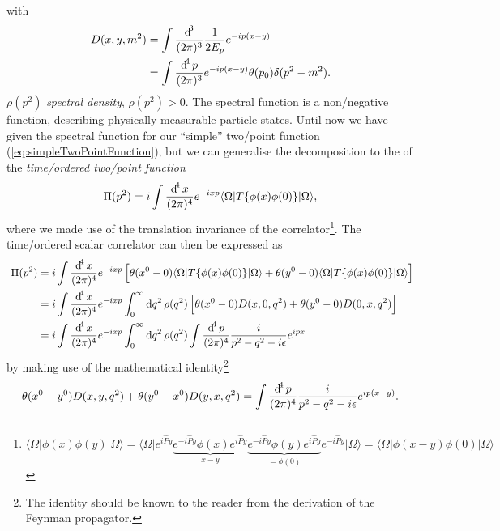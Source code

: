 \documentclass[../../index.tex]{subfiles}
\begin{document}
with
\begin{equation}
  \begin{split}
    D(x,y,m^2) &= \int \frac{\dif^3}{(2\pi)^3} \frac{1}{2E_p} e^{-i p (x-y)} \\
    &= \int \frac{\dif^4 p}{(2\pi)^3} e^{-i p (x-y)} \theta(p_0) \delta(p^2 -
    m^2).
  \end{split}
\end{equation}
$\rho(p^2)$ \textit{spectral density}, $\rho(p^2) > 0$. The spectral function is
a non\-/negative function, describing physically measurable particle states.
Until now we have given the spectral function for our ``simple'' two\-/point
function (\cref{eq:simpleTwoPointFunction}), but we can generalise the
decomposition to the  of the
\textit{time\-/ordered two\-/point function}
\begin{equation}
  \Pi(p^2) = i\int\fdif{x} e^{-ixp}\langle\Omega\vert T\{\phi(x)\phi(0) \} \vert\Omega\rangle,
\end{equation}
where we made use of the translation invariance of the correlator\footnote{
  $\langle\Omega\vert\phi(x)\phi(y)\vert\Omega\rangle = \langle\Omega\vert
  e^{i\hat P y}\underbrace{e^{-i\hat P y}\phi(x)e^{i\hat P
      y}}_{x-y}\underbrace{e^{-i\hat P y}\phi(y)e^{i \hat P y}}_{=\phi(0)}e^{-i
    \hat P y} \vert\Omega\rangle =
  \langle\Omega\vert\phi(x-y)\phi(0)\vert\Omega\rangle$}. The time\-/ordered
scalar correlator can then be expressed as
\begin{equation}
  \
  \begin{split}
    \Pi(p^2)
    &= i\int\fdif{x}e^{-ixp}\left[\theta(x^0-0) \langle\Omega\vert T\{ \phi(x)\phi(0) \} \vert\Omega\rangle + \theta(y^0-0)\langle\Omega\vert T\{ \phi(x)\phi(0) \} \vert\Omega\rangle\right]  \\
    &= i\int\fdif{x}e^{-ixp}\int_0^\infty \dif q^2\, \rho(q^2) \left[ \theta(x^0-0)D(x,0,q^2) + \theta(y^0-0)D(0,x,q^2) \right] \\
    &= i\int\fdif{x}e^{-ixp}\int_0^\infty \dif q^2\, \rho(q^2) \int\fdif{p}
    \frac{i}{p^2 - q^2 - i\epsilon}e^{ipx}
  \end{split}
\end{equation}
by making use of the mathematical identity\footnote{The identity should be known
  to the reader from the derivation of the Feynman propagator.}
\begin{equation}
  \theta(x^0-y^0)D(x,y,q^2) + \theta(y^0-x^0)D(y,x,q^2) = \int \fdif{p} \frac{i}{p^2-q^2-i\epsilon}e^{ip(x-y)}.
\end{equation}
\end{document}
